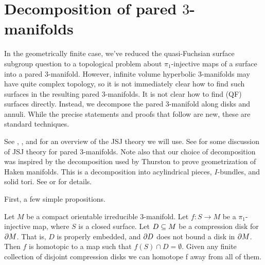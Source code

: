 \section{Decomposition of pared $3$-manifolds}

In the geometrically finite case, we've reduced the quasi-Fuchsian surface
subgroup question to a topological problem about $\pi_1$-injective maps of
a surface into a pared $3$-manifold. However, infinite volume hyperbolic
$3$-manifolds may have quite complex topology, so it is not immediately clear
how to find such surfaces in the resulting pared $3$-manifolds. It is not clear
how to find (QF) surfaces directly. Instead, we decompose the pared
$3$-manifold along disks and annuli. While the precise statements and proofs
that follow are new, these are standard techniques.

See \cite{Ja}, \cite{JacoShalen}, and \cite{Johannson} for an overview of the
JSJ theory we will use.  See \cite{CMc} for some discussion of JSJ theory for
pared $3$-manifolds.  Note also that our choice of decomposition was inspired
by the decomposition used by Thurston to prove geometrization of Haken
manifolds.  This is a decomposition into acylindrical pieces, $I$-bundles, and
solid tori.  See \cite{Mo} or \cite{ThurstonIII} for details.

First, a few simple propositions.

\begin{prop}

Let $M$ be a compact orientable irreducible $3$-manifold. Let $f \colon S \to
M$ be a $\pi_1$-injective map, where $S$ is a closed surface.  Let $D \subseteq M$
be a compression disk for $\partial M$. That is, $D$ is properly embedded, and $\partial
D$ does not bound a disk in $\partial M$. Then $f$ is homotopic to a map such that
$f(S) \cap D = \emptyset$. Given any finite collection of disjoint compression
disks we can homotope f away from all of them.

\end{prop}

